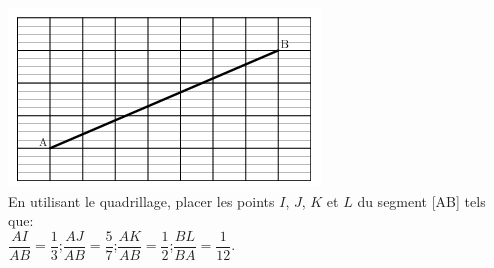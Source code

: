 
\includegraphics[scale=1]{TR-exo22.png} \\

En utilisant le quadrillage, placer les points $I$, $J$, $K$ et $L$ du
segment [AB] tels que:\\
$\dfrac{AI}{AB}=\dfrac{1}{3}$;\quad$\dfrac{AJ}{AB}=\dfrac{5}{7}$;\quad$\dfrac{AK}{AB}=\dfrac{1}{2}$;\quad$\dfrac{BL}{BA}=\dfrac{1}{12}$.

